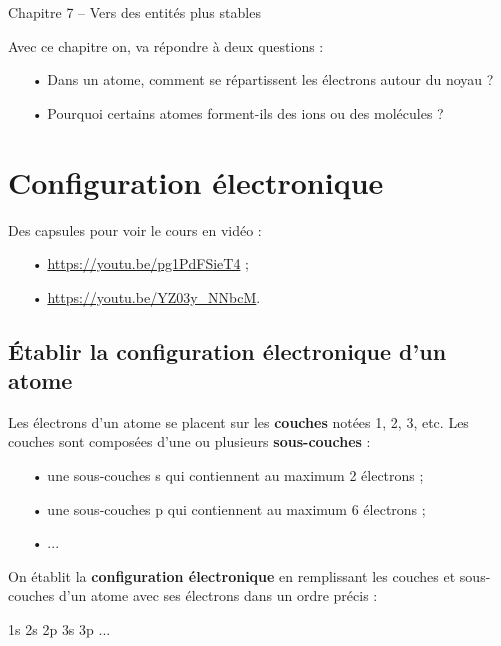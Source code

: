 \documentclass[12pt,a4paper]{article}
\begin{document}
\begin{header}
Chapitre 7 -- Vers des entités plus stables
\end{header}

Avec ce chapitre on, va répondre à deux questions :
\begin{itemize}
\item[•] Dans un atome, comment se répartissent les électrons autour du noyau ?
\item[•] Pourquoi certains atomes forment-ils des ions ou des molécules ?
\end{itemize}

\section{Configuration électronique}

Des capsules pour voir le cours en vidéo : 
\begin{itemize}
\item[•] \href{https://youtu.be/pg1PdFSieT4}{https://youtu.be/pg1PdFSieT4} ;
\item[•] \href{https://youtu.be/YZ03y\_NNbcM}{https://youtu.be/YZ03y\_NNbcM}.
\end{itemize}

\subsection{Établir la configuration électronique d'un atome}

Les électrons d'un atome se placent sur les \textbf{couches} notées \textcolor{red_f}{1}, \textcolor{green_f}{2}, \textcolor{bleu_f}{3}, etc.
Les couches sont composées d'une ou plusieurs \textbf{sous-couches} :
\begin{itemize}
\item[•] une sous-couches s qui contiennent au maximum 2 électrons ;
\item[•] une sous-couches p qui contiennent au maximum 6 électrons ;
\item[•] ...
\end{itemize}

On établit la \textbf{configuration électronique} en remplissant les couches et sous-couches d'un atome avec ses électrons dans un ordre précis :
\begin{center}
\textcolor{red_f}{1s} \textrightarrow{} \textcolor{green_f}{2s} \textrightarrow{} \textcolor{green_f}{2p} \textrightarrow{} \textcolor{bleu_f}{3s} \textrightarrow{} \textcolor{bleu_f}{3p} \textrightarrow{} ...
\end{center}
\end{document}
